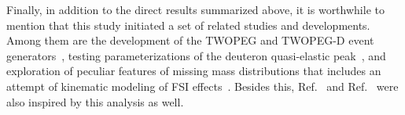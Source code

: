 Finally, in addition to the direct results summarized above, it is worthwhile to mention that this study initiated a set of related studies and developments. Among them are the development of the TWOPEG and TWOPEG-D event generators~\cite{twopeg,twopeg-d}, testing parameterizations of the deuteron quasi-elastic peak~\cite{note_QE_peak}, and exploration of peculiar features of missing mass distributions that includes an attempt of kinematic modeling of FSI effects~\cite{note_mm_distr}. Besides this, Ref.~\cite{Skorodumina:2015rea} and Ref.~\cite{Skorodumina:2016pnb} were also inspired by this analysis as well.%





